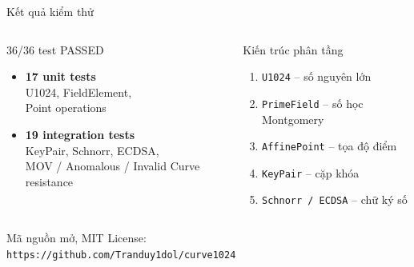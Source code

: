 \begin{frame}{Kết quả kiểm thử}
  \begin{columns}[t]
      \begin{block}{36/36 test PASSED}
        \begin{itemize}
          \item \textbf{17 unit tests}\\
                U1024, FieldElement,\\Point operations
          \item \textbf{19 integration tests}\\
                KeyPair, Schnorr, ECDSA,\\
                MOV / Anomalous / Invalid Curve resistance
        \end{itemize}
      \end{block}
      \begin{block}{Kiến trúc phân tầng}
        \begin{enumerate}
          \item \texttt{U1024} -- số nguyên lớn
          \item \texttt{PrimeField} -- số học Montgomery
          \item \texttt{AffinePoint} -- tọa độ điểm
          \item \texttt{KeyPair} -- cặp khóa
          \item \texttt{Schnorr / ECDSA} -- chữ ký số
        \end{enumerate}
      \end{block}
  \end{columns}
  \vspace{0.3em}
  Mã nguồn mở, MIT License:\\
  \texttt{https://github.com/Tranduy1dol/curve1024}
\end{frame}
